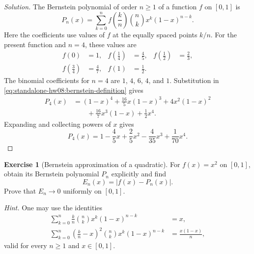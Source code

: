 \documentclass[11pt,letterpaper]{article}
\theoremstyle{definition}
\newtheorem{exercise}{Exercise}
\begin{document}
\begin{proof}[Solution]
  The Bernstein polynomial of order $n\ge1$ of a function $f$ on
  $[0,1]$ is
  \begin{equation}
    P_n(x)=\sum_{k=0}^{n}f\left(\frac{k}{n}\right)
      \binom{n}{k}x^k(1-x)^{n-k}.
    \label{eq:standalone-hw08:bernstein-definition}
  \end{equation}
  Here the coefficients use values of $f$ at the equally spaced points
  $k/n$. For the present function and $n=4$, these values are
  \[
    \begin{aligned}
      f(0)&=1,& f\left(\frac14\right)&=\frac45,
      &f\left(\frac12\right)&=\frac23,\\
      f\left(\frac34\right)&=\frac47,&f(1)&=\frac12.
    \end{aligned}
  \]
  The binomial coefficients for $n=4$ are $1$, $4$, $6$, $4$, and $1$.
  Substitution in \autoref{eq:standalone-hw08:bernstein-definition} gives
  \[
    \begin{aligned}
      P_4(x)
        &=(1-x)^4+\frac{16}{5}x(1-x)^3+4x^2(1-x)^2\\
        &\qquad+\frac{16}{7}x^3(1-x)+\frac12x^4.
    \end{aligned}
  \]
  Expanding and collecting powers of $x$ gives
  \[
    P_4(x)=1-\frac45x+\frac25x^2-\frac4{35}x^3+\frac1{70}x^4.
  \]
\end{proof}

\begin{exercise}[Bernstein approximation of a quadratic]
  \label{ex:standalone-hw08:bernstein-quadratic}
  For $f(x)=x^2$ on $[0,1]$, obtain its Bernstein polynomial $P_n$
  explicitly and find
  \[
    E_n(x)=|f(x)-P_n(x)|.
  \]
  Prove that $E_n\to0$ uniformly on $[0,1]$.

  \textit{Hint.} One may use the identities
  \[
    \begin{aligned}
      \sum_{k=0}^{n}\frac{k}{n}\binom{n}{k}x^k(1-x)^{n-k}&=x,\\
      \sum_{k=0}^{n}\left(\frac{k}{n}-x\right)^2
        \binom{n}{k}x^k(1-x)^{n-k}&=\frac{x(1-x)}{n},
    \end{aligned}
  \]
  valid for every $n\ge1$ and $x\in[0,1]$.
\end{exercise}
\end{document}
